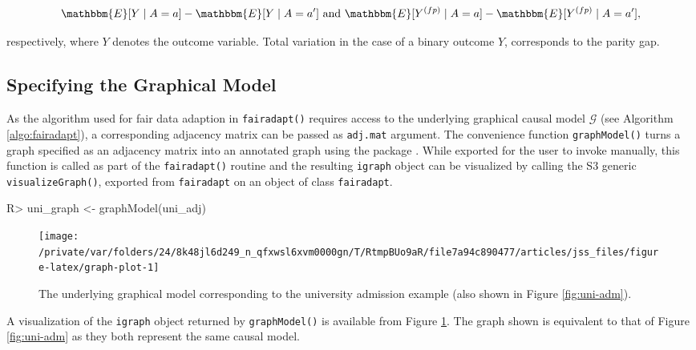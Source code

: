 \documentclass[
  nojss]{jss}
\begin{document}
\[\mathbbm{E}[Y \mid A = a] - \mathbbm{E}[Y \mid A = a'] \text{ and } \mathbbm{E}[ {Y}^{(fp)} \mid A = a] - \mathbbm{E}[ {Y}^{(fp)} \mid A = a'],\]

respectively, where \(Y\) denotes the outcome variable. Total variation
in the case of a binary outcome \(Y\), corresponds to the parity gap.

\hypertarget{specifying-the-graphical-model}{%
\subsection{Specifying the Graphical
Model}\label{specifying-the-graphical-model}}

As the algorithm used for fair data adaption in \texttt{fairadapt()}
requires access to the underlying graphical causal model \(\mathcal{G}\)
(see Algorithm \ref{algo:fairadapt}), a corresponding adjacency matrix
can be passed as \texttt{adj.mat} argument. The convenience function
\texttt{graphModel()} turns a graph specified as an adjacency matrix
into an annotated graph using the  package
\citep{csardi2006igraph}. While exported for the user to invoke
manually, this function is called as part of the \texttt{fairadapt()}
routine and the resulting \texttt{igraph} object can be visualized by
calling the S3 generic \texttt{visualizeGraph()}, exported from
\texttt{fairadapt} on an object of class \texttt{fairadapt}.

\begin{CodeChunk}
\begin{CodeInput}
R> uni_graph <- graphModel(uni_adj)
\end{CodeInput}
\end{CodeChunk}

\begin{CodeChunk}
\begin{figure}

{\centering \texttt{[image: /private/var/folders/24/8k48jl6d249\_n\_qfxwsl6xvm0000gn/T/RtmpBUo9aR/file7a94c890477/articles/jss\_files/figure-latex/graph-plot-1]} 

}

\caption{The underlying graphical model corresponding to the university admission example (also shown in Figure \ref{fig:uni-adm}).}\label{fig:graph-plot}
\end{figure}
\end{CodeChunk}

A visualization of the \texttt{igraph} object returned by
\texttt{graphModel()} is available from Figure \ref{fig:graph-plot}. The
graph shown is equivalent to that of Figure \ref{fig:uni-adm} as they
both represent the same causal model.
\end{document}
